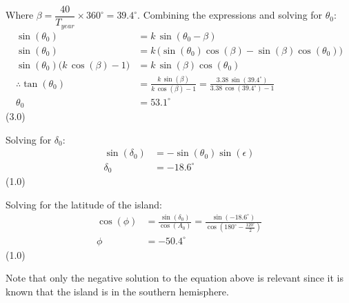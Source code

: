 \begin{description}
  Where
  $\beta = \dfrac{40}{T_{year}} \times 360^\circ = 39.4^\circ$. Combining the
  expressions and solving for $\theta_0$:
  \begin{align*}
    \sin(\theta_0) &= k\,\sin(\theta_0 - \beta)\\
    \sin(\theta_0) &= k\,\bigl(\sin(\theta_0)\cos(\beta)
                     - \sin(\beta)\cos(\theta_0)\bigr)\\
    \sin(\theta_0)\bigl(k\,\cos(\beta) - 1\bigr)
      &= k\,\sin(\beta)\cos(\theta_0)\\
    \therefore \tan(\theta_0)
      &= \frac{k\,\sin(\beta)}{k\,\cos(\beta) - 1}
       = \frac{3.38\,\sin(39.4^\circ)}{3.38\,\cos(39.4^\circ) - 1}\\
    \theta_0 &= 53.1^\circ
  \end{align*}
  \hfill(3.0)

  Solving for $\delta_0$:
  \begin{align*}
    \sin(\delta_0) &= -\sin(\theta_0)\sin(\epsilon)\\
    \delta_0 &= -18.6^\circ
  \end{align*}
  \hfill(1.0)

  Solving for the latitude of the island:
  \begin{align*}
    \cos(\phi) &= \frac{\sin(\delta_0)}{\cos(A_0)}
      = \frac{\sin(-18.6^\circ)}
             {\cos\left(180^\circ - \frac{120^\circ}{2}\right)}\\
    \phi &= -50.4^\circ
  \end{align*}
  \hfill(1.0)

  Note that only the negative solution to the equation above is relevant since
  it is known that the island is in the southern hemisphere.
\end{description}

